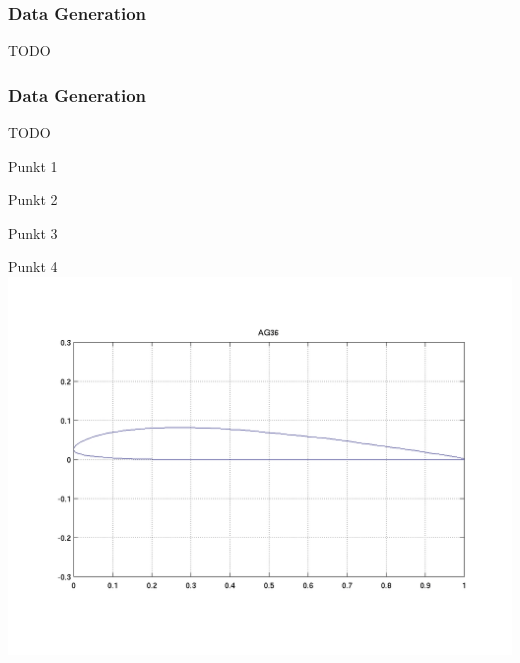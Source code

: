 \begin{frame}
    \frametitle{Data Generation}

TODO

\end{frame}
\clearpage

\begin{frame}
    \frametitle{Data Generation}

\begin{multicols}{2}
    TODO

    Punkt 1

    Punkt 2

    Punkt 3

    Punkt 4
    \vfill\columnbreak
    \includegraphics[width=\columnwidth, height=.7\textheight]{./Ressourcen/Praesentation/Bilder/uiuc_sample.png}%
\end{multicols}
    
\end{frame}
\clearpage